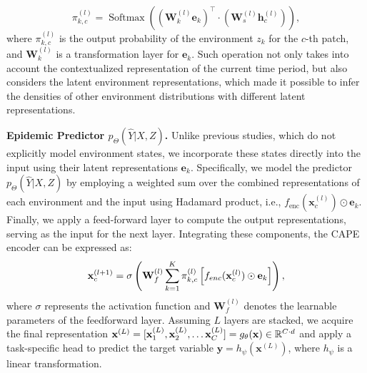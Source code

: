 \begin{equation}
\label{eq: env_estimator}
\pi_{k, c}^{(l)} = \operatorname{Softmax} \left( (\mathbf{W}_k^{(l)} \mathbf{e}_k)^\top \cdot (\mathbf{W}_s^{(l)} \mathbf{h}_c^{(l)}) \right),
\end{equation}
where $\pi_{k, c}^{(l)}$ is the output probability of the environment $z_{k}$ for the $c$-th patch, and \( \mathbf{W}_k^{(l)} \) is a transformation layer for  \( \mathbf{e}_k \).
Such operation not only takes into account the contextualized representation of the current time period, but also considers the latent environment representations, which made it possible to infer the densities of other environment distributions with different latent representations.

\textbf{Epidemic Predictor $p_\Theta(\hat{Y}|X,Z)$.} Unlike previous studies, which do not explicitly model environment states, we incorporate these states directly into the input using their latent representations $\mathbf{e}_k$. Specifically, {we model the predictor $p_\Theta(\hat{Y}|X,Z)$ by employing a weighted sum over the combined representations of each environment and the input using Hadamard product, i.e., $f_\text{enc}(\mathbf{x}_c^{(l)}) \odot \mathbf{e}_k$. Finally, we apply a feed-forward layer to compute the output representations, serving as the input for the next layer.} Integrating these components, the CAPE encoder can be expressed as:
\begin{equation}
\small
\label{Eq: model}
\mathbf{x}^{(l+1)}_{c}
= \sigma \left(
  \mathbf{W}_f^{(l)}
  \sum_{k=1}^{K}
    \pi_{k, c}^{(l)}
    \left[
      f_{enc}({\mathbf{x}_c^{(l)}})
      \odot 
      \mathbf{e}_k
    \right]
\right),
\end{equation}
where \( \sigma \) represents the activation function and \( \mathbf{W}_f^{(l)} \) denotes the learnable parameters of the feedforward layer. Assuming $L$ layers are stacked, we acquire the final representation $\mathbf{x}^{(L)} = [\mathbf{x}^{(L)}_1, \mathbf{x}^{(L)}_2, \ldots \mathbf{x}^{(L)}_C] = g_\theta({\bf x}) \in \mathbb{R}^{C \cdot d}$ and apply a task-specific head to predict the target variable $\mathbf{y}=h_\psi(\mathbf{x}^{(L)})$, where $h_\psi$ is a linear transformation.

